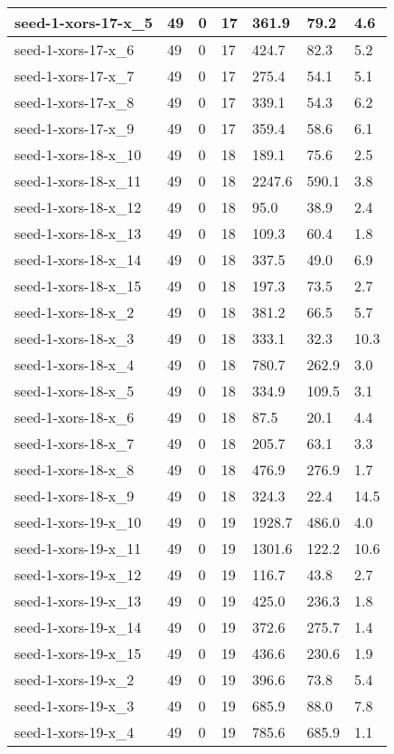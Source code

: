 \begin{scriptsize}
\begin{longtable}{|p{5cm}|l|l|l|l|l|l|}
seed-1-xors-17-x\_5&49&0&17&361.9&79.2&4.6 \\ \hline 
seed-1-xors-17-x\_6&49&0&17&424.7&82.3&5.2 \\ \hline 
seed-1-xors-17-x\_7&49&0&17&275.4&54.1&5.1 \\ \hline 
seed-1-xors-17-x\_8&49&0&17&339.1&54.3&6.2 \\ \hline 
seed-1-xors-17-x\_9&49&0&17&359.4&58.6&6.1 \\ \hline 
seed-1-xors-18-x\_10&49&0&18&189.1&75.6&2.5 \\ \hline 
seed-1-xors-18-x\_11&49&0&18&2247.6&590.1&3.8 \\ \hline 
seed-1-xors-18-x\_12&49&0&18&95.0&38.9&2.4 \\ \hline 
seed-1-xors-18-x\_13&49&0&18&109.3&60.4&1.8 \\ \hline 
seed-1-xors-18-x\_14&49&0&18&337.5&49.0&6.9 \\ \hline 
seed-1-xors-18-x\_15&49&0&18&197.3&73.5&2.7 \\ \hline 
seed-1-xors-18-x\_2&49&0&18&381.2&66.5&5.7 \\ \hline 
seed-1-xors-18-x\_3&49&0&18&333.1&32.3&10.3 \\ \hline 
seed-1-xors-18-x\_4&49&0&18&780.7&262.9&3.0 \\ \hline 
seed-1-xors-18-x\_5&49&0&18&334.9&109.5&3.1 \\ \hline 
seed-1-xors-18-x\_6&49&0&18&87.5&20.1&4.4 \\ \hline 
seed-1-xors-18-x\_7&49&0&18&205.7&63.1&3.3 \\ \hline 
seed-1-xors-18-x\_8&49&0&18&476.9&276.9&1.7 \\ \hline 
seed-1-xors-18-x\_9&49&0&18&324.3&22.4&14.5 \\ \hline 
seed-1-xors-19-x\_10&49&0&19&1928.7&486.0&4.0 \\ \hline 
seed-1-xors-19-x\_11&49&0&19&1301.6&122.2&10.6 \\ \hline 
seed-1-xors-19-x\_12&49&0&19&116.7&43.8&2.7 \\ \hline 
seed-1-xors-19-x\_13&49&0&19&425.0&236.3&1.8 \\ \hline 
seed-1-xors-19-x\_14&49&0&19&372.6&275.7&1.4 \\ \hline 
seed-1-xors-19-x\_15&49&0&19&436.6&230.6&1.9 \\ \hline 
seed-1-xors-19-x\_2&49&0&19&396.6&73.8&5.4 \\ \hline 
seed-1-xors-19-x\_3&49&0&19&685.9&88.0&7.8 \\ \hline 
seed-1-xors-19-x\_4&49&0&19&785.6&685.9&1.1 \\ \hline 

\end{longtable}
\end{scriptsize}
